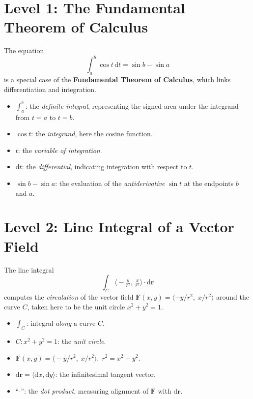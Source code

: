\documentclass[11pt,openany]{article}
\begin{document}
\vfill
\section*{Level 1: The Fundamental Theorem of Calculus}

The equation
\[
\int_a^b \cos t \,\mathrm{d}t = \sin b - \sin a
\]
is a special case of the \textbf{Fundamental Theorem of Calculus}, which links differentiation and integration.

\begin{itemize}
	\item \(\displaystyle \int_a^b\): the \emph{definite integral}, representing the signed area under the integrand from \(t=a\) to \(t=b\).
	\item \(\cos t\): the \emph{integrand}, here the cosine function.
	\item \(t\): the \emph{variable of integration}.
	\item \(\mathrm{d}t\): the \emph{differential}, indicating integration with respect to \(t\).
	\item \(\sin b - \sin a\): the evaluation of the \emph{antiderivative} \(\sin t\) at the endpoints \(b\) and \(a\).
\end{itemize}

\medskip

\section*{Level 2: Line Integral of a Vector Field}

The line integral
\[
\int_{C} \bigl\langle -\tfrac{y}{r^2},\,\tfrac{x}{r^2}\bigr\rangle \cdot \mathrm{d}\mathbf{r}
\]
computes the {\em circulation} of the vector field \(\mathbf{F}(x,y)=\langle -y/r^2,\;x/r^2\rangle\) around the curve \(C\), taken here to be the unit circle \(x^2+y^2=1\).

\begin{itemize}
	\item \(\displaystyle \int_C\): integral \emph{along} a curve \(C\).
	\item \(C: x^2+y^2=1\): the \emph{unit circle}.
	\item \(\mathbf{F}(x,y)=\bigl\langle -y/r^2,\;x/r^2\bigr\rangle,\;r^2=x^2+y^2\).
	\item \(\mathrm{d}\mathbf{r}=\langle \mathrm{d}x,\mathrm{d}y\rangle\): the infinitesimal tangent vector.
	\item “\(\cdot\)”: the \emph{dot product}, measuring alignment of \(\mathbf{F}\) with \(\mathrm{d}\mathbf{r}\).
\end{itemize}
\end{document}
